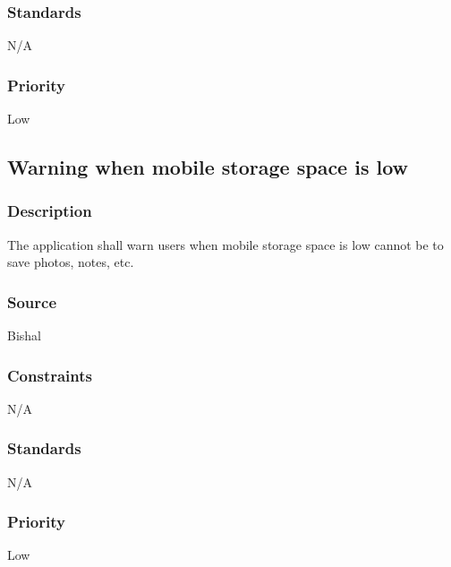\subsubsection{Standards}
N/A
\subsubsection{Priority}
Low

\subsection{Warning when mobile storage space is low}
\subsubsection{Description}
The application shall warn users when mobile storage space is low cannot be to save photos, notes, etc.
\subsubsection{Source}
Bishal
\subsubsection{Constraints}
N/A
\subsubsection{Standards}
N/A
\subsubsection{Priority}
Low